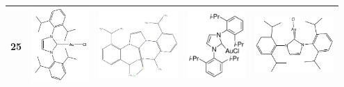 \begin{landscape}
\begin{longtable}{m{0.3cm}
                >{\centering}m{4.8cm}
                >{\centering}m{4.8cm}
                >{\centering}m{4.8cm}
                >{\centering\arraybackslash}m{4.8cm}}
 25 &
 \includegraphics[width=2.2cm]{imagenes/resultados/anexo_expertos/mol25.png} & 
 \includegraphics[width=3cm]{imagenes/resultados/anexo_expertos/mol25_openbabel.png} & 
 \includegraphics[width=2.2cm]{imagenes/sigmaAldrich/[(IPr)AuCl].png} & 
 \includegraphics[width=3cm]{imagenes/sciFinder/pdf/[(IPr)AuCl].pdf} \\
\midrule



\end{longtable}
\end{landscape}
